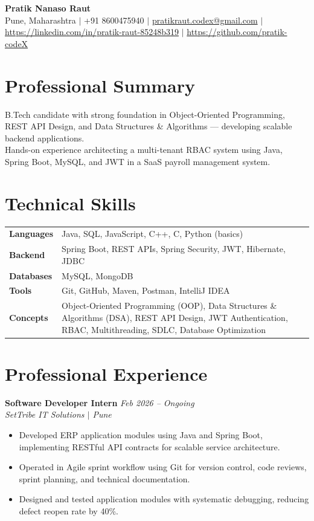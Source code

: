 \documentclass[10.5pt,a4paper]{article}
\begin{document}
\begin{center}
{\Large\bfseries Pratik Nanaso Raut}\\[2pt]
Pune, Maharashtra $|$ +91 8600475940 $|$ \href{mailto:pratikraut.codex@gmail.com}{pratikraut.codex@gmail.com} $|$ \href{https://linkedin.com/in/pratik-raut-85248b319}{https://linkedin.com/in/pratik-raut-85248b319} $|$ \href{https://github.com/pratik-codeX}{https://github.com/pratik-codeX}
\end{center}
\vspace{-2pt}
\section{Professional Summary}
B.Tech candidate with strong foundation in Object-Oriented Programming, REST API Design, and Data Structures \& Algorithms — developing scalable backend applications.\\[2pt]
Hands-on experience architecting a multi-tenant RBAC system using Java, Spring Boot, MySQL, and JWT in a SaaS payroll management system.
\section{Technical Skills}
\begin{tabular}{@{}p{}p{}@{}}
\textbf{Languages} & Java, SQL, JavaScript, C++, C, Python (basics) \\[1pt]
\textbf{Backend} & Spring Boot, REST APIs, Spring Security, JWT, Hibernate, JDBC \\[1pt]
\textbf{Databases} & MySQL, MongoDB \\[1pt]
\textbf{Tools} & Git, GitHub, Maven, Postman, IntelliJ IDEA \\[1pt]
\textbf{Concepts} & Object-Oriented Programming (OOP), Data Structures \& Algorithms (DSA), REST API Design, JWT Authentication, RBAC, Multithreading, SDLC, Database Optimization \\
\end{tabular}
\section{Professional Experience}
\textbf{Software Developer Intern} \hfill \textit{Feb 2026 -- Ongoing}
\\\textit{SetTribe IT Solutions $|$ Pune}
\begin{itemize}
  \item Developed ERP application modules using Java and Spring Boot, implementing RESTful API contracts for scalable service architecture.
  \item Operated in Agile sprint workflow using Git for version control, code reviews, sprint planning, and technical documentation.
  \item Designed and tested application modules with systematic debugging, reducing defect reopen rate by 40\%.
\end{itemize}
\end{document}
